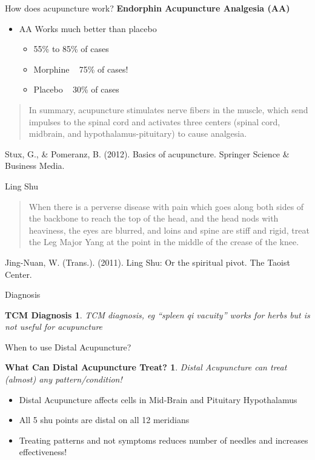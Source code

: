 \documentclass{beamer}
\begin{document}
\begin{frame}{How does acupuncture work?} %
  \textbf{\Large Endorphin Acupuncture Analgesia (AA)}
  \begin{itemize}
  \item AA Works much better than placebo
    \begin{itemize}
    \item 55\% to 85\% of cases
    \item Morphine ~ 75\% of cases!
    \item Placebo ~ 30\% of cases
    \end{itemize}
  \end{itemize}
  \begin{quote}
    In summary, acupuncture stimulates nerve fibers in the muscle, which send impulses to the spinal cord and activates three centers (spinal cord, midbrain, and hypothalamus-pituitary) to cause analgesia.
  \end{quote}

  Stux, G., \& Pomeranz, B. (2012). Basics of acupuncture. Springer Science \& Business Media. 
  
\end{frame}

\begin{frame}{Ling Shu} %
  \begin{quote}
    When there is a perverse disease with pain which goes along both sides of the backbone to reach the top of the head, and the head nods with heaviness, the eyes are blurred, and loins and spine are stiff and rigid, treat the Leg Major Yang at the point in the middle of the crease of the knee.
  \end{quote}

  Jing-Nuan, W. (Trans.). (2011). Ling Shu: Or the spiritual pivot. The Taoist Center.
\end{frame}

\begin{frame}{Diagnosis} %
  \newtheorem{t1.4}{TCM Diagnosis}
  \begin{t1.4}
    TCM diagnosis, eg ``spleen qi vacuity'' works for herbs but is not useful for acupuncture
  \end{t1.4}

\end{frame}

\begin{frame}{When to use Distal Acupuncture?} %
  \newtheorem{t1.5}{What Can Distal Acupuncture Treat?}
  \begin{t1.5}
    Distal Acupuncture can treat (almost) any pattern/condition!
  \end{t1.5}

  \begin{itemize}
  \item Distal Acupuncture affects cells in Mid-Brain and Pituitary Hypothalamus
  \item All 5 shu points are distal on all 12 meridians
  \item Treating patterns and not symptoms reduces number of needles and increases effectiveness!
  \end{itemize}

\end{frame}
\end{document}
